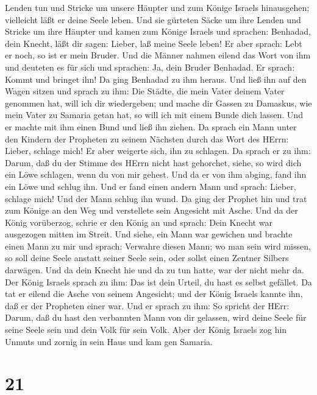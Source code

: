 Lenden tun und Stricke um unsere Häupter und zum Könige Israels
hinausgehen; vielleicht läßt er deine Seele leben.  Und sie
gürteten Säcke um ihre Lenden und Stricke um ihre Häupter und kamen zum
Könige Israels und sprachen: Benhadad, dein Knecht, läßt dir sagen:
Lieber, laß meine Seele leben! Er aber sprach: Lebt er noch, so ist er
mein Bruder.  Und die Männer nahmen eilend das Wort von ihm
und deuteten es für sich und sprachen: Ja, dein Bruder Benhadad. Er
sprach: Kommt und bringet ihn! Da ging Benhadad zu ihm heraus. Und ließ
ihn auf den Wagen sitzen  und sprach zu ihm: Die Städte,
die mein Vater deinem Vater genommen hat, will ich dir wiedergeben; und
mache dir Gassen zu Damaskus, wie mein Vater zu Samaria getan hat, so
will ich mit einem Bunde dich lassen. Und er machte mit ihm einen Bund
und ließ ihn ziehen.  Da sprach ein Mann unter den Kindern
der Propheten zu seinem Nächsten durch das Wort des HErrn: Lieber,
schlage mich! Er aber weigerte sich, ihn zu schlagen.  Da
sprach er zu ihm: Darum, daß du der Stimme des HErrn nicht hast
gehorchet, siehe, so wird dich ein Löwe schlagen, wenn du von mir
gehest. Und da er von ihm abging, fand ihn ein Löwe und schlug ihn.
 Und er fand einen andern Mann und sprach: Lieber, schlage
mich! Und der Mann schlug ihn wund.  Da ging der Prophet
hin und trat zum Könige an den Weg und verstellete sein Angesicht mit
Asche.  Und da der König vorüberzog, schrie er den König an
und sprach: Dein Knecht war ausgezogen mitten im Streit. Und siehe, ein
Mann war gewichen und brachte einen Mann zu mir und sprach: Verwahre
diesen Mann; wo man sein wird missen, so soll deine Seele anstatt seiner
Seele sein, oder sollst einen Zentner Silbers darwägen. 
Und da dein Knecht hie und da zu tun hatte, war der nicht mehr da. Der
König Israels sprach zu ihm: Das ist dein Urteil, du hast es selbst
gefället.  Da tat er eilend die Asche von seinem Angesicht;
und der König Israels kannte ihn, daß er der Propheten einer war.
 Und er sprach zu ihm: So spricht der HErr: Darum, daß du
hast den verbannten Mann von dir gelassen, wird deine Seele für seine
Seele sein und dein Volk für sein Volk.  Aber der König
Israels zog hin Unmuts und zornig in sein Haus und kam gen Samaria.

\hypertarget{section-20}{%
\section{21}\label{section-20}}

